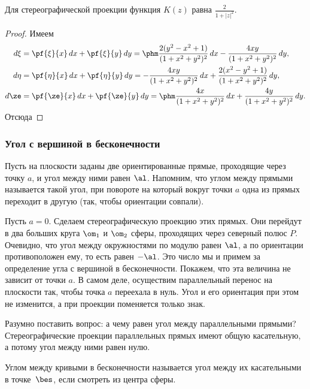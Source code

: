 \documentclass[a4paper]{article}
\begin{document}
\begin{stm}
Для стереографической проекции функция $K(z)$ равна $\frac{2}{1+|z|^2}$.
\end{stm}
\begin{proof}
Имеем
\begin{align}
d\xi &= \pf{\xi}{x}\,dx+\pf{\xi}{y}\,dy =\phm\frac{2(y^2-x^2+1)}{(1+x^2+y^2)^2}\,dx - \frac{4xy}{(1+x^2+y^2)^2}\,dy,\\
d\eta &= \pf{\eta}{x}\,dx+\pf{\eta}{y}\,dy =- \frac{4xy}{(1+x^2+y^2)^2}\,dx+ \frac{2(x^2-y^2+1)}{(1+x^2+y^2)^2}\,dy,\\
d\ze &= \pf{\ze}{x}\,dx+\pf{\ze}{y}\,dy = \phm\frac{4x}{(1+x^2+y^2)^2}\,dx + \frac{4y}{(1+x^2+y^2)^2}\,dy.\\
\end{align}
Отсюда
\hfill\end{proof}

\subsubsection{Угол с вершиной в бесконечности}

Пусть на плоскости заданы две ориентированные прямые, проходящие через точку $a$, и угол между ними равен $\al$.
Напомним, что углом между прямыми называется такой угол, при повороте на который вокруг точки $a$ одна из
прямых переходит в другую (так, чтобы ориентации совпали).

Пусть $a= 0$. Сделаем стереографическую проекцию этих прямых. Они перейдут в два больших круга $\om_1$ и $\om_2$ сферы,
проходящих через северный полюс $P$. Очевидно, что угол между окружностями по модулю равен $\al$, а по ориентации\т
противоположен ему, то есть равен $-\al$. Это число мы и примем за определение угла с вершиной в
бесконечности. Покажем, что эта величина не зависит от точки $a$. В самом деле, осуществим параллельный перенос на
плоскости так, чтобы точка $a$ переехала в нуль. Угол и его ориентация при этом не изменится, а при проекции поменяется
только знак.

Разумно поставить вопрос: а чему равен угол между параллельными прямыми? Стереографические проекции параллельных прямых
имеют общую касательную, а потому угол между ними равен нулю.

\begin{df}
Углом между кривыми в бесконечности называется угол между их касательными в точке~$\bes$, если смотреть из центра сферы.
\end{df}
\end{document}
